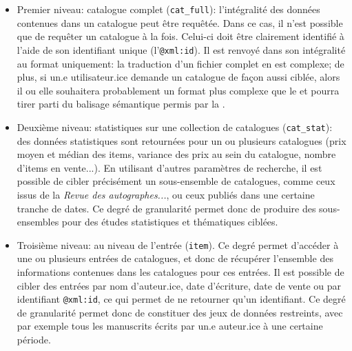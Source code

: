 \begin{itemize}
	\item Premier niveau: catalogue complet (\texttt{cat\_full}): l'intégralité des données contenues dans un catalogue peut être requêtée. Dans ce cas, il n'est possible que de requêter un catalogue à la fois. Celui-ci doit être clairement identifié à l'aide de son identifiant unique (l'\texttt{@xml:id}). Il est renvoyé dans son intégralité au format \xml{} uniquement: la traduction d'un fichier \xmltei{} complet en \json{} est complexe; de plus, si un.e utilisateur.ice demande un catalogue de façon aussi ciblée, alors il ou elle souhaitera probablement un format plus complexe que le \json{} et pourra tirer parti du balisage sémantique permis par la \tei{}.
	\item Deuxième niveau: statistiques sur une collection de catalogues (\texttt{cat\_stat}): des données statistiques sont retournées pour un ou plusieurs catalogues (prix moyen et médian des items, variance des prix au sein du catalogue, nombre d'items en vente...). En utilisant d'autres paramètres de recherche, il est possible de cibler précisément un sous-ensemble de catalogues, comme ceux issus de la \textit{Revue des autographes...}, ou ceux publiés dans une certaine tranche de dates. Ce degré de granularité permet donc de produire des sous-ensembles pour des études statistiques et thématiques ciblées.
	\item Troisième niveau: au niveau de l'entrée (\texttt{item}). Ce degré permet d'accéder à une ou plusieurs entrées de catalogues, et donc de récupérer l'ensemble des informations contenues dans les catalogues pour ces entrées. Il est possible de cibler des entrées par nom d'auteur.ice, date d'écriture, date de vente ou par identifiant \texttt{@xml:id}, ce qui permet de ne retourner qu'un identifiant. Ce degré de granularité permet donc de constituer des jeux de données restreints, avec par exemple tous les manuscrits écrits par un.e auteur.ice à une certaine période.
\end{itemize}

